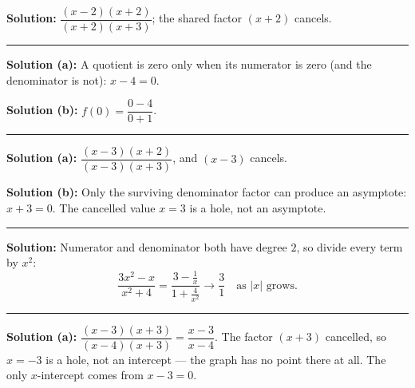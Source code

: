\documentclass[12pt]{article}
\begin{document}



\textbf{Solution:} $\dfrac{(x-2)(x+2)}{(x+2)(x+3)}$; the shared factor $(x+2)$
cancels. 

\vspace{0.2cm}\noindent\rule{\linewidth}{0.2pt}\vspace{0.2cm}


\textbf{Solution (a):} A quotient is zero only when its numerator is zero (and
the denominator is not): $x - 4 = 0$. 

\textbf{Solution (b):} $f(0) = \dfrac{0-4}{0+1}$. 

\vspace{0.2cm}\noindent\rule{\linewidth}{0.2pt}\vspace{0.2cm}


\textbf{Solution (a):} $\dfrac{(x-3)(x+2)}{(x-3)(x+3)}$, and $(x-3)$ cancels.

\textbf{Solution (b):} Only the surviving denominator factor can produce an
asymptote: $x + 3 = 0$. The cancelled value $x = 3$ is a hole, not an asymptote.

\vspace{0.2cm}\noindent\rule{\linewidth}{0.2pt}\vspace{0.2cm}


\textbf{Solution:} Numerator and denominator both have degree $2$, so divide
every term by $x^2$:
\[ \frac{3x^2-x}{x^2+4} = \frac{3 - \frac{1}{x}}{1 + \frac{4}{x^2}}
   \longrightarrow \frac{3}{1} \quad\text{as } |x| \text{ grows.} \]

\vspace{0.2cm}\noindent\rule{\linewidth}{0.2pt}\vspace{0.2cm}


\textbf{Solution (a):} $\dfrac{(x-3)(x+3)}{(x-4)(x+3)} = \dfrac{x-3}{x-4}$. The
factor $(x+3)$ cancelled, so $x = -3$ is a hole, not an intercept --- the graph
has no point there at all. The only $x$-intercept comes from $x - 3 = 0$.
\end{document}
